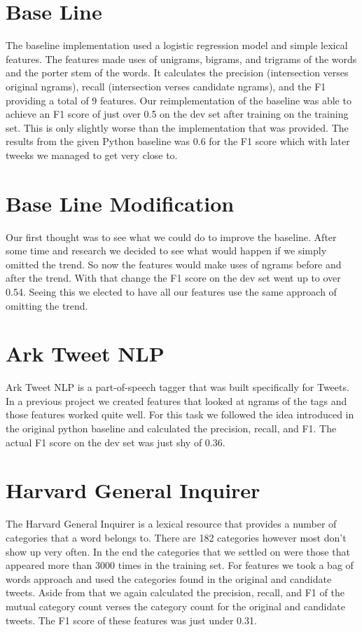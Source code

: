 \documentclass[11pt,letterpaper]{article}
\begin{document}
\section{Base Line}
The baseline implementation used a logistic regression model and simple lexical features. The features made uses of unigrams, bigrams, and trigrams of the words and the porter stem of the words. It calculates the precision (intersection verses original ngrams), recall (intersection verses candidate ngrams), and the F1 providing a total of 9 features. Our reimplementation of the baseline was able to achieve an F1 score of just over 0.5 on the dev set after training on the training set. This is only slightly worse than the implementation that was provided. The results from the given Python baseline was 0.6 for the F1 score which with later tweeks we managed to get very close to.

\section{Base Line Modification}


Our first thought was to see what we could do to improve the baseline. After some time and research we decided to see what would happen if we simply omitted the trend. So now the features would make uses of ngrams before and after the trend. With that change the F1 score on the dev set went up to over 0.54. Seeing this we elected to have all our features use the same approach of omitting the trend.

\section{Ark Tweet NLP}
Ark Tweet NLP is a part-of-speech tagger that was built specifically for Tweets. In a previous project we created features that looked at ngrams of the tags and those features worked quite well. For this task we followed the idea introduced in the original python baseline and calculated the precision, recall, and F1. The actual F1 score on the dev set was just shy of 0.36. %

\section{Harvard General Inquirer}
The Harvard General Inquirer is a lexical resource that provides a number of categories that a word belongs to. There are 182 categories however most don't show up very often. In the end the categories that we settled on were those that appeared more than 3000 times in the training set. For features we took a bag of words approach and used the categories found in the original and candidate tweets. Aside from that we again calculated the precision, recall, and F1 of the mutual category count verses the category count for the original and candidate tweets. The F1 score of these features was just under 0.31.
\end{document}
